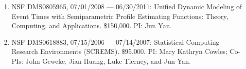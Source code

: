 \documentclass[Statistics]{vita}
\begin{document}
\begin{vita}
\begin{enumerate}
    \item NSF DMS0805965, 07/01/2008 --- 06/30/2011: Unified Dynamic Modeling of Event Times with Semiparametric Profile Estimating Functions: Theory, Computing, and Applications. \$150,000. PI: Jun Yan.
    \item NSF DMS0618883, 07/15/2006 --- 07/14/2007: Statistical Computing Research Environments (SCREMS). \$95,000. PI: Mary Kathryn Cowles; Co-PIs: John Geweke, Jian Huang, Luke Tierney, and Jun Yan.
  \end{enumerate}

\end{vita}
\end{document}

